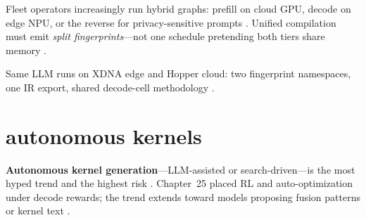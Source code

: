 Fleet operators increasingly run hybrid graphs: prefill on cloud GPU, decode on edge NPU, or the reverse for privacy-sensitive prompts \citep{amd2024xdna,amd2024aie,kwon2023vllm,patel2025llminference,yirage2026,chen2020compilerbasedhardw,liu2024deepseekv3,memoryfloor2026,taxbreak2026,dlbook,semianalysis2024tma,dao2022flashattention,dao2023flashdecoding,nvidia2024cudagraphs,nvidia2022hopper,amd2024xdna}. Unified compilation must emit \emph{split fingerprints}---not one schedule pretending both tiers share memory \citep{yirage2026,chen2020compilerbasedhardw,patel2025llminference,kwon2023vllm,liu2024deepseekv3,memoryfloor2026,taxbreak2026,amd2024aie,dlbook,semianalysis2024tma,amd2024xdna,dao2022flashattention,dao2023flashdecoding,nvidia2024cudagraphs,nvidia2022hopper,amd2024xdna}.

\begin{example}
Same LLM runs on XDNA edge and Hopper cloud: two fingerprint namespaces, one IR export, shared decode-cell methodology \citep{amd2024xdna,yirage2026,chen2020compilerbasedhardw,patel2025llminference,kwon2023vllm,liu2024deepseekv3,memoryfloor2026,taxbreak2026,amd2024aie,dlbook,semianalysis2024tma,dao2022flashattention,dao2023flashdecoding,nvidia2024cudagraphs,nvidia2022hopper,amd2024xdna}.
\end{example}

\section{autonomous kernels}
\label{sec:ch27_autonomous_kernels}

\textbf{Autonomous kernel generation}---LLM-assisted or search-driven---is the most hyped trend and the highest risk \citep{chen2020compilerbasedhardw,yirage2026,patel2025llminference,kwon2023vllm,liu2024deepseekv3,memoryfloor2026,taxbreak2026,amd2024aie,dlbook,semianalysis2024tma,amd2024xdna,dao2022flashattention,dao2023flashdecoding,nvidia2024cudagraphs,nvidia2022hopper,amd2024xdna}. Chapter~25 placed RL and auto-optimization under decode rewards; the trend extends toward models proposing fusion patterns or kernel text \citep{yirage2026,chen2020compilerbasedhardw,patel2025llminference,memoryfloor2026,taxbreak2026,kwon2023vllm,liu2024deepseekv3,amd2024aie,dlbook,semianalysis2024tma,amd2024xdna,dao2022flashattention,dao2023flashdecoding,nvidia2024cudagraphs,nvidia2022hopper}.

